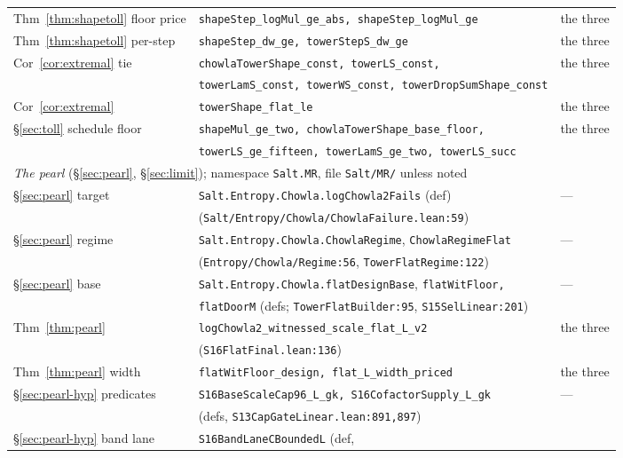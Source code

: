 \documentclass[11pt]{amsart}
\newcommand{\leaninline}[1]{{\small\texttt{#1}}}
\theoremstyle{remark}
\begin{document}
\begin{table}[h]
\begin{tabular}{lll}
Thm~\ref{thm:shapetoll} floor price & \leaninline{shapeStep\_logMul\_ge\_abs,
  shapeStep\_logMul\_ge} & the three \\
Thm~\ref{thm:shapetoll} per-step & \leaninline{shapeStep\_dw\_ge,
  towerStepS\_dw\_ge} & the three \\
Cor~\ref{cor:extremal} tie & \leaninline{chowlaTowerShape\_const, towerLS\_const,}
  & the three \\
 & \leaninline{towerLamS\_const, towerWS\_const, towerDropSumShape\_const} & \\
Cor~\ref{cor:extremal} & \leaninline{towerShape\_flat\_le} & the three \\
\S\ref{sec:toll} schedule floor & \leaninline{shapeMul\_ge\_two,
  chowlaTowerShape\_base\_floor,} & the three \\
 & \leaninline{towerLS\_ge\_fifteen, towerLamS\_ge\_two, towerLS\_succ} & \\
\midrule
\multicolumn{3}{l}{\emph{The pearl} (\S\ref{sec:pearl}, \S\ref{sec:limit});
namespace \leaninline{Salt.MR}, file \texttt{Salt/MR/} unless noted} \\
\midrule
\S\ref{sec:pearl} target & \leaninline{Salt.Entropy.Chowla.logChowla2Fails}
  (def) & --- \\
 & (\texttt{Salt/Entropy/Chowla/ChowlaFailure.lean:59}) & \\
\S\ref{sec:pearl} regime & \leaninline{Salt.Entropy.Chowla.ChowlaRegime},
  \leaninline{ChowlaRegimeFlat} & --- \\
 & (\texttt{Entropy/Chowla/Regime:56}, \texttt{TowerFlatRegime:122}) & \\
\S\ref{sec:pearl} base & \leaninline{Salt.Entropy.Chowla.flatDesignBase},
  \leaninline{flatWitFloor,} & --- \\
 & \leaninline{flatDoorM} (defs; \texttt{TowerFlatBuilder:95}, \texttt{S15SelLinear:201}) & \\
Thm~\ref{thm:pearl} & \leaninline{logChowla2\_witnessed\_scale\_flat\_L\_v2}
  & the three \\
 & (\texttt{S16FlatFinal.lean:136}) & \\
Thm~\ref{thm:pearl} width & \leaninline{flatWitFloor\_design,
  flat\_L\_width\_priced} & the three \\
\S\ref{sec:pearl-hyp} predicates & \leaninline{S16BaseScaleCap96\_L\_gk,
  S16CofactorSupply\_L\_gk} & --- \\
 & (defs, \texttt{S13CapGateLinear.lean:891,897}) & \\
\S\ref{sec:pearl-hyp} band lane & \leaninline{S16BandLaneCBoundedL} (def,

\end{tabular}
\end{table}
\end{document}
